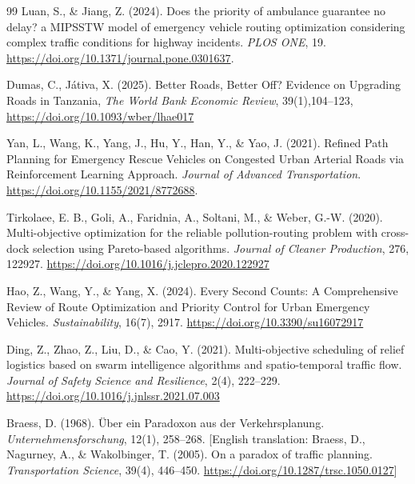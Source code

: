 \documentclass[paper=A4, 12pt, mathscr]{report}
\begin{document}
	
	\newpage
	\makeatletter
	\patchcmd{\@makeschapterhead}{\vspace*{50\p@}}{}{}{}%
	\makeatother
	\renewcommand\bibname{\centerline{\large REFERENCES}
		\global\def\bibname{BIBLIOGRAPHY}}
	\begin{thebibliography}{99}
		 Luan, S., \& Jiang, Z. (2024). Does the priority of ambulance guarantee no delay? a MIPSSTW model of emergency vehicle routing optimization considering complex traffic conditions for highway incidents. \textit{PLOS ONE}, 19. \url{https://doi.org/10.1371/journal.pone.0301637}.
		
		 Dumas, C., Játiva, X. (2025). Better Roads, Better Off? Evidence on Upgrading Roads in Tanzania, \textit{The World Bank Economic Review}, 39(1),104–123,\url{ https://doi.org/10.1093/wber/lhae017}
		
		 Yan, L., Wang, K., Yang, J., Hu, Y., Han, Y., \& Yao, J. (2021). Refined Path Planning for Emergency Rescue Vehicles on Congested Urban Arterial Roads via Reinforcement Learning Approach. \textit{Journal of Advanced Transportation}. \url{https://doi.org/10.1155/2021/8772688}.
		
		 Tirkolaee, E. B., Goli, A., Faridnia, A., Soltani, M., \& Weber, G.-W. (2020). Multi-objective optimization for the reliable pollution-routing problem with cross-dock selection using Pareto-based algorithms. \textit{Journal of Cleaner Production}, 276, 122927. \url{https://doi.org/10.1016/j.jclepro.2020.122927}
		
		 Hao, Z., Wang, Y., \& Yang, X. (2024). Every Second Counts: A Comprehensive Review of Route Optimization and Priority Control for Urban Emergency Vehicles. \textit{Sustainability}, 16(7), 2917. \url{https://doi.org/10.3390/su16072917}
		
		 Ding, Z., Zhao, Z., Liu, D., \& Cao, Y. (2021). Multi-objective scheduling of relief logistics based on swarm intelligence algorithms and spatio-temporal traffic flow. \textit{Journal of Safety Science and Resilience}, 2(4), 222–229. \url{https://doi.org/10.1016/j.jnlssr.2021.07.003}
		
		Braess, D. (1968). \"Uber ein Paradoxon aus der Verkehrsplanung.
		\textit{Unternehmensforschung}, 12(1), 258--268.
		[English translation: Braess, D., Nagurney, A., \& Wakolbinger, T.
		(2005). On a paradox of traffic planning.
		\textit{Transportation Science}, 39(4), 446--450.
		\url{https://doi.org/10.1287/trsc.1050.0127}]
		

\end{thebibliography}
\end{document}
